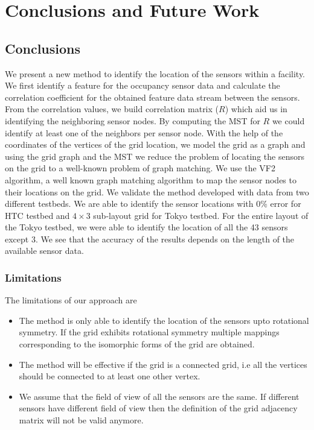 \chapter{Conclusions and Future Work}
\label{chp:conclusionsandfuturework}

\section{Conclusions}
We present a new method to identify the location of the sensors within a facility. We first identify a feature for the occupancy sensor data and calculate the correlation coefficient for the obtained feature data stream between the sensors. From the correlation values, we build correlation matrix ($R$)  which aid us in identifying the neighboring sensor nodes. By computing the MST for $R$ we could identify at least one of the neighbors per sensor node. With the help of the coordinates of the vertices of the grid location, we model the grid as a graph and using the grid graph and the MST we reduce the problem of locating the sensors on the grid to a well-known problem of graph matching. We use the VF2 algorithm, a well known graph matching algorithm to map the sensor nodes to their locations on the grid. We validate the method developed with data from two different testbeds. We are able to identify the sensor locations with 0\% error for HTC testbed and $4\times3$ sub-layout grid for Tokyo testbed. For the entire layout of the Tokyo testbed, we were able to identify the location of all the 43 sensors except 3.  We see that the accuracy of the results depends on the length of the available sensor data.  
\subsection{Limitations}
The limitations of our approach are 
\begin{itemize}
\item The method is only able to identify the location of the sensors upto rotational symmetry. If the grid exhibits rotational symmetry multiple mappings corresponding to the isomorphic forms of the grid are obtained.
\item The method will be effective if the grid is a connected grid, i.e all the vertices should be connected to at least one other vertex.
\item We assume that the field of view of all the sensors are the same. If different sensors have different field of view then the definition of the grid adjacency matrix will not be valid anymore.

\end{itemize}




